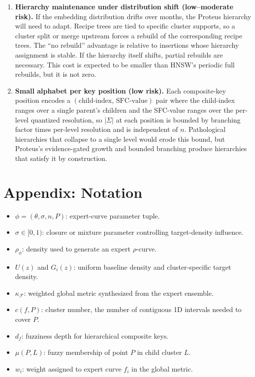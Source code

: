 \documentclass[11pt]{article}
\newcommand{\kappaf}{\kappa_{\mathcal F}}
\newcommand{\rhophi}{\rho_{\phi}}
\begin{document}
\begin{enumerate}[leftmargin=1.5em]
    \item \textbf{Hierarchy maintenance under distribution shift (low--moderate risk).} If the embedding distribution drifts over months, the Proteus hierarchy will need to adapt. Recipe trees are tied to specific cluster supports, so a cluster split or merge upstream forces a rebuild of the corresponding recipe trees. The ``no rebuild'' advantage is relative to insertions whose hierarchy assignment is stable. If the hierarchy itself shifts, partial rebuilds are necessary. This cost is expected to be smaller than HNSW's periodic full rebuilds, but it is not zero.

    \item \textbf{Small alphabet per key position (low risk).} Each composite-key position encodes a $(\text{child-index},\,\text{SFC-value})$ pair where the child-index ranges over a single parent's children and the SFC-value ranges over the per-level quantized resolution, so $|\Sigma|$ at each position is bounded by branching factor times per-level resolution and is independent of $n$. Pathological hierarchies that collapse to a single level would erode this bound, but Proteus's evidence-gated growth and bounded branching produce hierarchies that satisfy it by construction.
\end{enumerate}

\section*{Appendix: Notation}
\begin{itemize}[leftmargin=1.5em]
    \item $\phi=(\theta,\sigma,n,P)$: expert-curve parameter tuple.
    \item $\sigma\in[0,1)$: closure or mixture parameter controlling target-density influence.
    \item $\rhophi$: density used to generate an expert $\rho$-curve.
    \item $U(z)$ and $G_i(z)$: uniform baseline density and cluster-specific target density.
    \item $\kappaf$: weighted global metric synthesized from the expert ensemble.
    \item $c(f,P)$: cluster number, the number of contiguous 1D intervals needed to cover $P$.
    \item $d_f$: fuzziness depth for hierarchical composite keys.
    \item $\mu(P,L)$: fuzzy membership of point $P$ in child cluster $L$.
    \item $w_i$: weight assigned to expert curve $f_i$ in the global metric.
\end{itemize}



\end{document}
